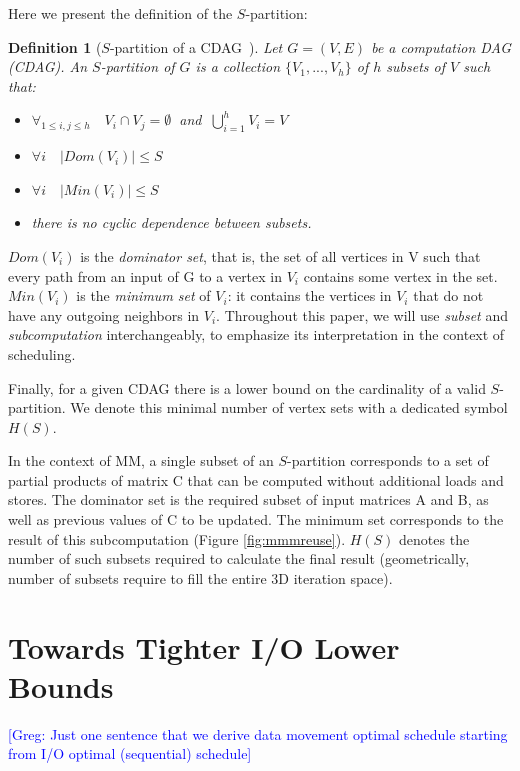 \documentclass[sigplan,review,anonymous]{acmart}\settopmatter{printfolios=true,printccs=false,printacmref=false}
\newcommand\greg[1]{\textcolor{blue}{[Greg: #1]}}
\newtheorem{defn}{Definition}
\begin{document}
Here we present the definition of the 
$S$-partition:

\begin{defn}[$S$-partition of a CDAG~\cite{redblue}]
\label{df:s-partition}
Let $G = (V,E)$ be a computation DAG (CDAG). An $S$-partition of $G$ 
is a collection $\{V_1, ..., V_h\}$ of $h$ subsets of $V$ such that:
	
\begin{itemize}
\item $\forall_{1 \le i,j \le h}\quad V_i \cap V_j =\emptyset\ $ and $\ 
\bigcup_{i=1}^{h} V_i=V$
\item $\forall i\quad |Dom(V_i)| \le S$
\item $\forall i\quad |Min(V_i)| \le S$
\item there is no cyclic dependence between subsets.
\end{itemize}
\end{defn}

$Dom(V_i)$ is the \emph{dominator set}, that is, the set of all vertices in V
such that every path from an input of G to a vertex in $V_i$ contains some
vertex in the set.
%
$Min(V_i)$ is the
\emph{minimum set} of $V_i$: it contains the vertices in $V_i$ that do not have
any outgoing neighbors in $V_i$. Throughout this paper, we will use 
\emph{subset} and \emph{subcomputation} interchangeably, to emphasize its 
interpretation in the context of scheduling. 

Finally, for a given CDAG there is a
lower bound on the cardinality of a valid $S$-partition.
We denote this minimal number of vertex sets with a dedicated symbol $H(S)$.

In the context of MM, a single subset of an $S$-partition corresponds to a set 
of partial products of matrix C that can be computed without additional loads 
and stores. The dominator set is the required subset of input matrices A and B, 
as well as previous values of C to be updated. The minimum set corresponds to 
the result of this subcomputation (Figure \ref{fig:mmmreuse}). $H(S)$ denotes 
the number of such subsets required to calculate the final result 
(geometrically, number of subsets require to fill the entire 3D iteration 
space).

\section{Towards Tighter I/O Lower Bounds}

\greg{Just one sentence that we derive data movement optimal schedule starting 
from I/O optimal (sequential) schedule}
\end{document}

